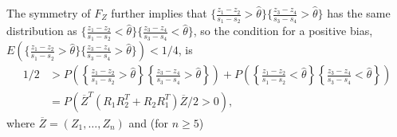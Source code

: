 \documentclass[12pt]{article}
\newcommand{\E}{E}
\renewcommand{\P}{P}
\newcommand{\z}{Z}
\newcommand{\y}{Y}
\newcommand{\x}{X}
\newcommand{\zvec}{\overline{Z}}
\newcommand{\Svec}{R}
\newcommand{\thetahat}{\hat{\theta}}
\begin{document}
    The symmetry of $F_Z$ further implies that $\{\frac{z_1-z_2}{s_1-s_2}>\thetahat\}\{\frac{z_3-z_4}{s_3-s_4}>\thetahat\}$ has the same distribution as $\{\frac{z_1-z_2}{s_1-s_2}<\thetahat\}\{\frac{z_3-z_4}{s_3-s_4}<\thetahat\}$, so the condition for a positive bias, $\E(\{\frac{z_1-z_2}{s_1-s_2}>\thetahat\}\{\frac{z_3-z_4}{s_3-s_4}>\thetahat\})<1/4$, is
      \begin{align}
        1/2 &> \P\left(\left\{\frac{z_1-z_2}{s_1-s_2}>\thetahat\right\}\left\{\frac{z_3-z_4}{s_3-s_4}>\thetahat\right\}\right) + \P\left(\left\{\frac{z_1-z_2}{s_1-s_2}<\thetahat\right\}\left\{\frac{z_3-z_4}{s_3-s_4}<\thetahat\right\}\right)\\
            &= \P(\zvec^T(\Svec_1\Svec_2^T+\Svec_2\Svec_1^T)\zvec/2>0),
      \end{align}
      where $\zvec=(\z_1,\ldots,\z_n)$ and (for $n\ge 5$)
\end{document}
